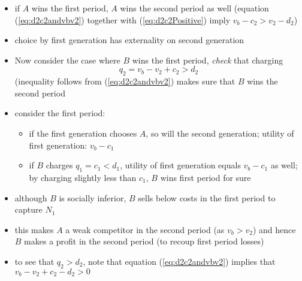 \documentclass[11pt,english]{beamer}
\begin{document}
\begin{frame}[allowframebreaks]
\begin{itemize}
\item if $A$ wins the first period, $A$ wins the second period as well
  (equation (\ref{eq:d2c2andvbv2}) together with
  (\ref{eq:d2c2Positive}) imply $v_{b}-c_{2} > v_{2}-d_{2}$)\\
\label{sec-6-1-18}%
\item choice by first generation has externality on second generation\\
\label{sec-6-1-19}%
\item Now consider the case where $B$ wins the first period, \emph{check} that charging
\label{sec-6-1-20}%
\begin{equation}
\label{eq:q2}
q_2=v_b-v_2+c_2 > d_2
\end{equation}
(inequality follows from (\ref{eq:d2c2andvbv2}) makes sure that $B$
wins the second period

\item consider the first period:
\label{sec-6-1-21}%
\begin{itemize}

\item if the first generation chooses $A$, so will the second generation; utility of first generation: $v_{b}-c_{1}$\\
\label{sec-6-1-21-1}%
\item if $B$ charges $q_{1}=c_{1}<d_{1}$, utility of first generation equals $v_{b}-c_{1}$ as well; by charging slightly less than $c_{1}$, $B$ wins first period for sure\\
\label{sec-6-1-21-2}%
\end{itemize} %

\item although $B$ is socially inferior, $B$ sells below costs in the first period to capture $N_{1}$\\
\label{sec-6-1-22}%
\item this makes $A$ a weak competitor in the second period (as $v_{b}>v_{2}$) and hence $B$ makes a profit in the second period (to recoup first period losses)\\
\label{sec-6-1-23}%
\item to see that $q_{2}>d_{2}$, note that equation (\ref{eq:d2c2andvbv2}) implies that $v_{b}-v_{2}+c_{2}-d_{2}>0$\\
\label{sec-6-1-24}%
\end{itemize} %
\end{frame}
\end{document}
